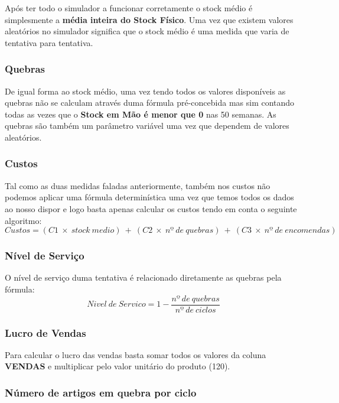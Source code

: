 \documentclass[a4paper]{article}
\begin{document}
 Após ter todo o simulador a funcionar corretamente o stock médio é simplesmente a \textbf{média inteira do Stock Físico}. Uma vez que existem valores aleatórios no simulador significa que o stock médio é uma medida que varia de tentativa para tentativa.
 
 \subsubsection{Quebras}
 
 De igual forma ao stock médio, uma vez tendo todos os valores disponíveis as quebras não se calculam através duma fórmula pré-concebida mas sim contando todas as vezes que o \textbf{Stock em Mão é menor que 0} nas 50 semanas. As quebras são também um parâmetro variável uma vez que dependem de valores aleatórios.
 
 \subsubsection{Custos}
  
 Tal como as duas medidas faladas anteriormente, também nos custos não podemos aplicar uma fórmula determinística uma vez que temos todos os dados ao nosso dispor e logo basta apenas calcular os custos tendo em conta o seguinte algoritmo:
 $$ Custos = (C1\ \times\ stock\ medio)\ +\ (C2\ \times\ nº\ de\ quebras)\ +\ (C3\ \times\ nº\ de\ encomendas) $$
 
 
 \subsubsection{Nível de Serviço}
 
 O nível de serviço duma tentativa é relacionado diretamente as quebras pela fórmula:
  $$ Nivel\ de\ Servico = 1 - \frac{nº\ de\ quebras}{nº\ de\ ciclos} $$
  
  
 \subsubsection{Lucro de Vendas}
 
 Para calcular o lucro das vendas basta somar todos os valores da coluna \textbf{VENDAS} e multiplicar pelo valor unitário do produto (120).
 
 \subsubsection{Número de artigos em quebra por ciclo}
  
\end{document}
